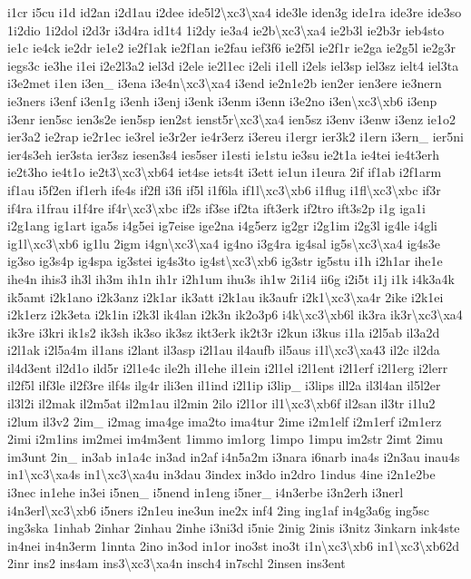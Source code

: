 {i1cr i5cu i1d id2an i2d1au i2dee ide5l2\textbackslash{}xc3\textbackslash{}xa4 ide3le iden3g ide1ra ide3re ide3so 1i2dio 1i2dol i2d3r i3d4ra id1t4 1i2dy ie3a4 ie2b\textbackslash{}xc3\textbackslash{}xa4 ie2b3l ie2b3r ieb4sto ie1c ie4ck ie2dr ie1e2 ie2f1ak ie2f1an ie2fau ief3f6 ie2f5l ie2f1r ie2ga ie2g5l ie2g3r iegs3c ie3he i1ei i2e2l3a2 iel3d i2ele ie2l1ec i2eli i1ell i2els iel3sp iel3sz ielt4 iel3ta i3e2met i1en i3en\-\_\- i3ena i3e4n\textbackslash{}xc3\textbackslash{}xa4 i3end ie2n1e2b ien2er ien3ere ie3nern ie3ners i3enf i3en1g i3enh i3enj i3enk i3enm i3enn i3e2no i3en\textbackslash{}xc3\textbackslash{}xb6 i3enp i3enr ien5sc ien3s2e ien5sp ien2st ienst5r\textbackslash{}xc3\textbackslash{}xa4 ien5sz i3env i3enw i3enz ie1o2 ier3a2 ie2rap ie2r1ec ie3rel ie3r2er ie4r3erz i3ereu i1ergr ier3k2 i1ern i3ern\-\_\- ier5ni ier4s3eh ier3sta ier3sz iesen3s4 ies5ser i1esti ie1stu ie3su ie2t1a ie4tei ie4t3erh ie2t3ho ie4t1o ie2t3\textbackslash{}xc3\textbackslash{}xb64 iet4se iets4t i3ett ie1un i1eura 2if if1ab i2f1arm if1au i5f2en if1erh ife4s if2fl i3fi if5l i1f6la if1l\textbackslash{}xc3\textbackslash{}xb6 i1flug i1fl\textbackslash{}xc3\textbackslash{}xbc if3r if4ra i1frau i1f4re if4r\textbackslash{}xc3\textbackslash{}xbc if2s if3se if2ta ift3erk if2tro ift3s2p i1g iga1i i2g1ang ig1art iga5s i4g5ei ig7eise ige2na i4g5erz ig2gr i2g1im i2g3l ig4le i4gli ig1l\textbackslash{}xc3\textbackslash{}xb6 ig1lu 2igm i4gn\textbackslash{}xc3\textbackslash{}xa4 ig4no i3g4ra ig4sal ig5s\textbackslash{}xc3\textbackslash{}xa4 ig4s3e ig3so ig3s4p ig4spa ig3stei ig4s3to ig4st\textbackslash{}xc3\textbackslash{}xb6 ig3str ig5stu i1h i2h1ar ihe1e ihe4n ihis3 ih3l ih3m ih1n ih1r i2h1um ihu3s ih1w 2i1i4 ii6g i2i5t i1j i1k i4k3a4k ik5amt i2k1ano i2k3anz i2k1ar ik3att i2k1au ik3aufr i2k1\textbackslash{}xc3\textbackslash{}xa4r 2ike i2k1ei i2k1erz i2k3eta i2k1in i2k3l ik4lan i2k3n ik2o3p6 i4k\textbackslash{}xc3\textbackslash{}xb6l ik3ra ik3r\textbackslash{}xc3\textbackslash{}xa4 ik3re i3kri ik1s2 ik3sh ik3so ik3sz ikt3erk ik2t3r i2kun i3kus i1la i2l5ab il3a2d i2l1ak i2l5a4m il1ans i2lant il3asp i2l1au il4aufb il5aus i1l\textbackslash{}xc3\textbackslash{}xa43 il2c il2da il4d3ent il2d1o ild5r i2l1e4c ile2h il1ehe il1ein i2l1el i2l1ent i2l1erf i2l1erg i2lerr il2f5l ilf3le il2f3re ilf4s ilg4r ili3en il1ind i2l1ip i3lip\-\_\- i3lips ill2a il3l4an il5l2er il3l2i il2mak il2m5at il2m1au il2min 2ilo i2l1or il1\textbackslash{}xc3\textbackslash{}xb6f il2san il3tr i1lu2 i2lum il3v2 2im\-\_\- i2mag ima4ge ima2to ima4tur 2ime i2m1elf i2m1erf i2m1erz 2imi i2m1ins im2mei im4m3ent 1immo im1org 1impo 1impu im2str 2imt 2imu im3unt 2in\-\_\- in3ab in1a4c in3ad in2af i4n5a2m i3nara i6narb ina4s i2n3au inau4s in1\textbackslash{}xc3\textbackslash{}xa4s in1\textbackslash{}xc3\textbackslash{}xa4u in3dau 3index in3do in2dro 1indus 4ine i2n1e2be i3nec in1ehe in3ei i5nen\-\_\- i5nend in1eng i5ner\-\_\- i4n3erbe i3n2erh i3nerl i4n3erl\textbackslash{}xc3\textbackslash{}xb6 i5ners i2n1eu ine3un ine2x inf4 2ing ing1af in4g3a6g ing5sc ing3ska 1inhab 2inhar 2inhau 2inhe i3ni3d i5nie 2inig 2inis i3nitz 3inkarn ink4ste in4nei in4n3erm 1innta 2ino in3od in1or ino3st ino3t i1n\textbackslash{}xc3\textbackslash{}xb6 in1\textbackslash{}xc3\textbackslash{}xb62d 2inr ins2 ins4am ins3\textbackslash{}xc3\textbackslash{}xa4n insch4 in7schl 2insen ins3ent }

